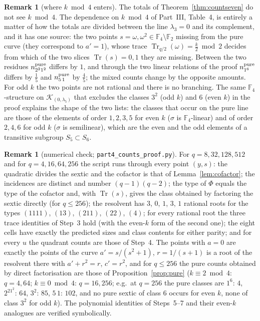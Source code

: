 \documentclass[12pt,a4paper]{amsart}
\theoremstyle{definition}
\newtheorem{remark}[theorem]{Remark}
\newcommand{\F}{\mathbb{F}}
\newcommand{\Tr}{\operatorname{Tr}}
\newcommand{\Kk}{\mathcal{K}}
\begin{document}
\begin{remark}[where $k\bmod4$ enters]\label{rem:kmod4}
The totals of Theorem~\ref{thm:countseven} do not see $k\bmod4$. The dependence on $k\bmod4$ of Part~III, Table~4, is entirely a matter of how the totals are divided between the line $\lambda_3=0$ and its complement, and it has one source: the two points $s=\omega,\omega^2\in\F_4\setminus\F_2$ missing from the pure curve (they correspond to $a'=1$), whose trace $\Tr_{q/2}(\omega)=\frac k2\bmod2$ decides from which of the two slices $\Tr(s)=0,1$ they are missing. Between the two residues $n^{\rm pure}_{2^21^2}$ differs by $1$, and through the two linear relations of the proof $n^{\rm pure}_{1^6}$ differs by $\frac15$ and $n^{\rm pure}_{5\,1}$ by $\frac45$; the mixed counts change by the opposite amounts. For odd $k$ the two points are not rational and there is no branching. The same $\F_4$-structure on $\Kk_{(0,\lambda_5)}$ that excludes the classes $3^2$ (odd $k$) and $6$ (even $k$) in the proof explains the shape of the two lists: the classes that occur on the pure line are those of the elements of order $1,2,3,5$ for even $k$ ($\sigma$ is $\F_4$-linear) and of order $2,4,6$ for odd $k$ ($\sigma$ is semilinear), which are the even and the odd elements of a transitive subgroup $S_5\subset S_6$.
\end{remark}

\begin{remark}[numerical check; \texttt{part4\_counts\_proof.py}]
For $q=8,32,128,512$ and for $q=4,16,64,256$ the script runs through every point $(y,s)$: the quadratic divides the sextic and the cofactor is that of Lemma~\ref{lem:cofactor}; the incidences are distinct and number $(q-1)(q-2)$; the type of $\Phi$ equals the type of the cofactor and, with $\Tr(s)$, gives the class obtained by factoring the sextic directly (for $q\le256$); the resolvent has $3$, $0$, $1$, $3$, $1$ rational roots for the types $(1111)$, $(13)$, $(211)$, $(22)$, $(4)$; for every rational root the three trace identities of Step~3 hold (with the even-$k$ form of the second one); the eight cells have exactly the predicted sizes and class contents for either parity; and for every $u$ the quadrant counts are those of Step~4. The points with $a=0$ are exactly the points of the curve $a'=s/(s^2+1)$, $r=1/(s+1)$ is a root of the resolvent there with $a'+r^2=r$, $c'=r^2$, and for $q\le256$ the pure counts obtained by direct factorisation are those of Proposition~\ref{prop:pure} ($k\equiv2\bmod4$: $q=4,64$; $k\equiv0\bmod4$: $q=16,256$; e.g.\ at $q=256$ the pure classes are $1^6{:}\,4$, $2^21^2{:}\,64$, $3^2{:}\,85$, $5\,1{:}\,102$, and no pure sextic of class $6$ occurs for even $k$, none of class $3^2$ for odd $k$). The polynomial identities of Steps~5--7 and their even-$k$ analogues are verified symbolically.
\end{remark}
\end{document}
